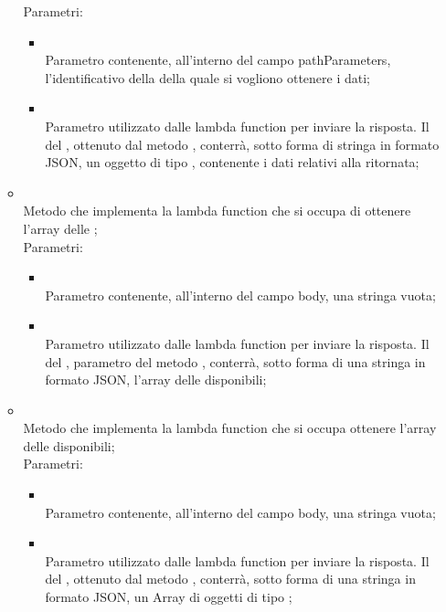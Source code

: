 \begin{itemize}
\begin{itemize}
		Parametri:
		\begin{itemize}
			\item {} \\
			Parametro contenente, all'interno del campo pathParameters, l'identificativo della  della quale si vogliono ottenere i dati;
			\item {} \\
			Parametro utilizzato dalle lambda function per inviare la risposta. Il  del , ottenuto dal metodo , conterrà, sotto forma di stringa in formato JSON, un oggetto di tipo , contenente i dati relativi alla  ritornata;
		\end{itemize}
		\item[]  \\
		Metodo che implementa la lambda function che si occupa di ottenere l'array delle ;\\
		Parametri:
		\begin{itemize}
			\item {} \\
			Parametro contenente, all'interno del campo body, una stringa vuota;
			\item {} \\
			Parametro utilizzato dalle lambda function per inviare la risposta. Il  del , parametro del metodo , conterrà, sotto forma di una stringa in formato JSON,  l'array delle  disponibili;
		\end{itemize}
		\item[]  \\
		Metodo che implementa la lambda function che si occupa ottenere l'array delle  disponibili;\\
		Parametri:
		\begin{itemize}
			\item {} \\
			Parametro contenente, all'interno del campo body, una stringa vuota;
			\item {} \\
			Parametro utilizzato dalle lambda function per inviare la risposta. Il  del , ottenuto dal metodo , conterrà, sotto forma di una stringa in formato JSON,  un Array di oggetti di tipo ;

\end{itemize}
\end{itemize}
\end{itemize}

